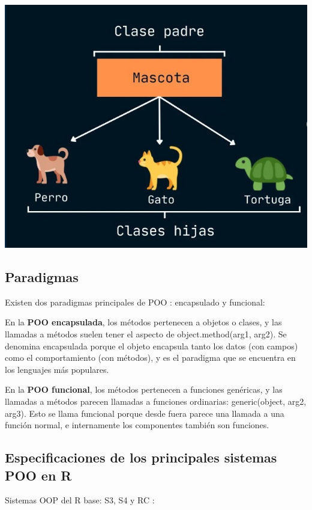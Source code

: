 \documentclass[
]{book}
\begin{document}
\includegraphics{graficasR6/ejemploherencia.jpg}

\hypertarget{paradigmas}{%
\subsection{Paradigmas}\label{paradigmas}}

Existen dos paradigmas principales de POO : encapsulado y funcional:

En la \textbf{POO encapsulada}, los métodos pertenecen a objetos o clases, y las llamadas a métodos suelen tener el aspecto de object.method(arg1, arg2). Se denomina encapsulada porque el objeto encapsula tanto los datos (con campos) como el comportamiento (con métodos), y es el paradigma que se encuentra en los lenguajes más populares.

En la \textbf{POO funcional}, los métodos pertenecen a funciones genéricas, y las llamadas a métodos parecen llamadas a funciones ordinarias: generic(object, arg2, arg3). Esto se llama funcional porque desde fuera parece una llamada a una función normal, e internamente los componentes también son funciones.

\hypertarget{especificaciones-de-los-principales-sistemas-poo-en-r}{%
\subsection{Especificaciones de los principales sistemas POO en R}\label{especificaciones-de-los-principales-sistemas-poo-en-r}}

Sistemas OOP del R base: S3, S4 y RC :
\end{document}
